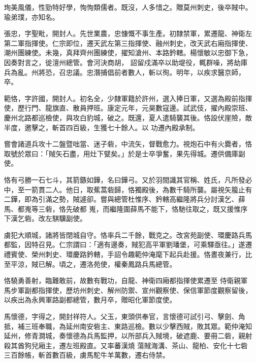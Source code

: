 \begin{pinyinscope}
 珣美風儀，性勁特好學，恂恂類儒者。既沒，人多惜之。贈莫州刺史，後卒賊中。瑜弟璞，亦知名。



 張忠，字聖毗，開封人。先世業農，忠慷慨不事生產。初隸禁軍，累遷龍、神衛左第二軍指揮使。仁宗即位，遷天武左第三指揮使、融州刺史，改天武右廂指揮使、潮州團練使。未幾，真拜齊州團練使，擢知滄州、本路鈐轄。楊懷敏以忠御下急，因奏對言之，徙澶州總管。會河決商胡，
 詔留戍滿卒以助堤役，輒群噪，將劫庫兵為亂。州將恐，召忠議。忠潛捕倡前者數人，斬以徇。明年，以疾求醫京師，卒。



 範恪，字許國，開封人。初名全，少隸軍籍於許州，選入捧日軍，又選為殿前指揮使，歷行門、龍旗直、散員押班。康定元年，元昊數寇邊。試武伎，擢內殿崇班、慶州北路都巡檢使，與攻白豹城，破之。既還，夏人遣騎襲其後。恪設伏崖險，敵半度，邀擊之，斬首四百級，生獲七十餘人。以
 功遷內殿承制。



 嘗會諸道兵攻十二盤暨咄當、迷子砦，中流矢，督戰愈力。視炮石中有火爨者，恪取號於眾曰：「賊矢石盡，用灶下甓矣。」於是士卒爭奮，果先得城。遷供備庫副使。



 恪有弓勝一石七斗，其箭鏃如鏵，名曰鏵弓。又於羽間識其官稱、姓氏，凡所發必中，至一箭貫二人。他日，取蕉蒿砦歸，恪獨殿後，為數千騎所襲。屬視矢箙止有二鏵，即為引滿之勢，賊遽卻。嘗與總管杜惟序、鈐轄高繼隆將兵分討漢乞、薛馬、都嵬等三砦，恪先破都
 嵬，而繼隆圍薛馬不能下，恪馳往取之，既又援惟序下漢乞砦。改左騏驥副使。



 虜犯大順城，諸將皆閉城自守。恪率兵二千餘，戰克之。改宮苑副使、環慶路兵馬都監，因特召見。仁宗謂曰：「適有邊奏，賊犯高平軍劉璠堡，可乘驛亟往。」遂遷禮賓使、榮州刺史、環慶路鈐轄，手詔令趣範仲淹麾下起兵赴援。恪晝夜兼行，比至平涼，賊已解。頃之，遷洛苑使，權秦鳳路兵馬總管。



 恪驍勇善射，臨難敢前，故數有戰功，自龍、神衛四廂都指揮使累遷至
 侍衛親軍馬步軍副都指揮使，歷坊州刺史、解州防禦、宣州觀察使、保信軍節度觀察留後，以疾出為永興軍路副都總管，數月卒，贈昭化軍節度使。



 馬懷德，字得之，開封祥符人。父玉，東頭供奉官，言懷德可試引弓、擊劍、角抵，補三班奉職，為延州南安砦主、東路巡檢。數以少擊西賊，敗其眾。範仲淹知延州，修青澗城，奏懷德為兵馬監押，以所部兵入賊境，破遮鹿、要冊二砦，親射殺其酋狗兒廂主，遷左班殿直。又率蕃漢燒
 蕩賊海溝、茶山、龍柏、安化十七砦三百餘帳，斬首數百級，虜馬駝牛羊萬數，遷右侍禁。




\end{pinyinscope}
